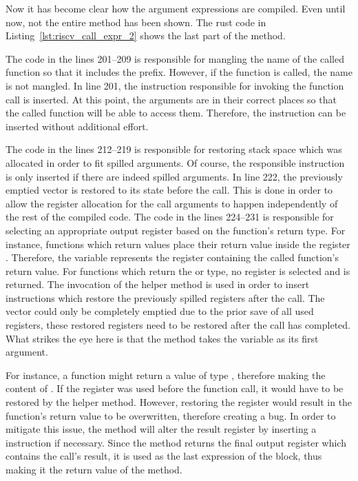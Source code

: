 Now it has become clear how the argument expressions are compiled.
Even until now, not the entire method has been shown.
The rust code in Listing~\ref{lst:riscv_call_expr_2} shows the last part of the method.


The code in the lines 201--209 is responsible for mangling the name of the called function so that it includes the  prefix.
However, if the  function is called, the name is not mangled.
In line 201, the  instruction responsible for invoking the function call is inserted.
At this point, the arguments are in their correct places so that the called function will be able to access them.
Therefore, the instruction can be inserted without additional effort.

The code in the lines 212--219 is responsible for restoring stack space which was allocated in order to fit spilled arguments.
Of course, the responsible  instruction is only inserted if there are indeed spilled arguments.
In line 222, the previously emptied  vector is restored to its state before the call.
This is done in order to allow the register allocation for the call arguments to happen independently of the rest of the compiled code.
The code in the lines 224--231 is responsible for selecting an appropriate output register based on the function's return type.
For instance, functions which return  values place their return value inside the register .
Therefore, the variable  represents the register containing the called function's return value.
For functions which return the \qVerb{()} or \qVerb{!} type, no register is selected and  is returned.
The invocation of the helper method  is used in order to insert instructions which restore the previously spilled registers after the call.
The  vector could only be completely emptied due to the prior save of all used registers, these restored registers need to be restored after the call has completed.
What strikes the eye here is that the method takes the  variable as its first argument.

For instance, a function might return a value of type , therefore making  the content of .
If the register  was used before the function call, it would have to be restored by the helper method.
However, restoring the register would result in the function's return value to be overwritten, therefore creating a bug.
In order to mitigate this issue, the method will alter the result register by inserting a  instruction if necessary.
Since the method returns the final output register which contains the call's result, it is used as the last expression of the block, thus making it the return value of the  method.


